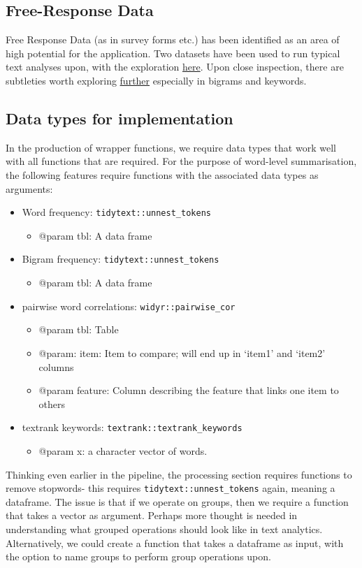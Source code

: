\documentclass[a4paper, 11pt]{article}
\begin{document}
\subsection{Free-Response Data}
\label{sec:org2e6e4c9}
Free Response Data (as in survey forms etc.) has been identified as an
area of high potential for the application. Two datasets have been
used to run typical text analyses upon, with the exploration \href{free-response.Rmd}{here}.
Upon close inspection, there are subtleties worth exploring \href{further-free-response.org}{further}
especially in bigrams and keywords.
\subsection{Data types for implementation}
\label{sec:org713af5e}
In the production of wrapper functions, we require data types that
work well with all functions that are required. For the purpose of
word-level summarisation, the following features require functions with the
associated data types as arguments:
\begin{itemize}
\item Word frequency: \texttt{tidytext::unnest\_tokens}
\begin{itemize}
\item @param tbl: A data frame
\end{itemize}
\item Bigram frequency: \texttt{tidytext::unnest\_tokens}
\begin{itemize}
\item @param tbl: A data frame
\end{itemize}
\item pairwise word correlations: \texttt{widyr::pairwise\_cor}
\begin{itemize}
\item @param tbl: Table
\item @param: item: Item to compare; will end up in ‘item1’ and ‘item2’
columns
\item @param feature: Column describing the feature that links one item
to others
\end{itemize}
\item textrank keywords: \texttt{textrank::textrank\_keywords}
\begin{itemize}
\item @param x: a character vector of words.
\end{itemize}
\end{itemize}

Thinking even earlier in the pipeline, the processing section requires
functions to remove stopwords- this requires \texttt{tidytext::unnest\_tokens}
again, meaning a dataframe. The issue is that if we operate on groups,
then we require a function that takes a vector as argument. Perhaps
more thought is needed in understanding what grouped operations should
look like in text analytics. Alternatively, we could create a function
that takes a dataframe as input, with the option to name groups to
perform group operations upon. 
\end{document}
